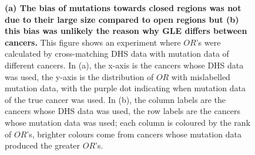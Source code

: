 \begin{figure}[htbp]
    \caption{\textbf{(a) The bias of mutations towards closed regions was not due to their large size compared to open regions but (b) this bias was unlikely the reason why GLE differs between cancers.} This figure shows an experiment where $OR$'s were calculated by cross-matching DHS data with mutation data of different cancers. In (a), the x-axis is the cancers whose DHS data was used, the y-axis is the distribution of $OR$ with mislabelled mutation data, with the purple dot indicating when mutation data of the true cancer was used. In (b), the column labels are the cancers whose DHS data was used, the row labels are the cancers whose mutation data was used; each column is coloured by the rank of $OR$'s, brighter colours come from cancers whose mutation data produced the greater $OR$'s.}
    \label{fig:mixed_or}
\end{figure}